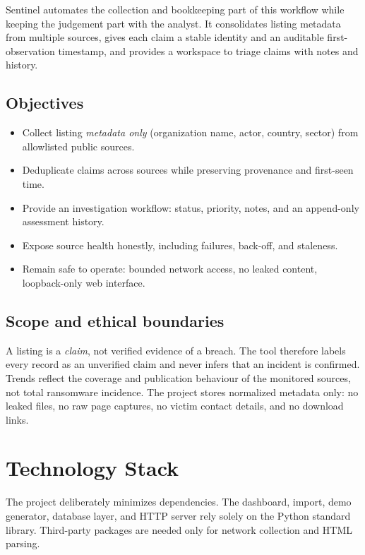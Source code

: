 \documentclass[11pt,a4paper]{article}
\begin{document}
Sentinel automates the collection and bookkeeping part of this workflow while keeping the judgement part with the analyst. It consolidates listing metadata from multiple sources, gives each claim a stable identity and an auditable first-observation timestamp, and provides a workspace to triage claims with notes and history.

\subsection{Objectives}
\begin{itemize}
  \item Collect listing \emph{metadata only} (organization name, actor, country, sector) from allowlisted public sources.
  \item Deduplicate claims across sources while preserving provenance and first-seen time.
  \item Provide an investigation workflow: status, priority, notes, and an append-only assessment history.
  \item Expose source health honestly, including failures, back-off, and staleness.
  \item Remain safe to operate: bounded network access, no leaked content, loopback-only web interface.
\end{itemize}

\subsection{Scope and ethical boundaries}
A listing is a \emph{claim}, not verified evidence of a breach. The tool therefore labels every record as an unverified claim and never infers that an incident is confirmed. Trends reflect the coverage and publication behaviour of the monitored sources, not total ransomware incidence. The project stores normalized metadata only: no leaked files, no raw page captures, no victim contact details, and no download links.

\section{Technology Stack}
The project deliberately minimizes dependencies. The dashboard, import, demo generator, database layer, and HTTP server rely solely on the Python standard library. Third-party packages are needed only for network collection and HTML parsing.
\end{document}
